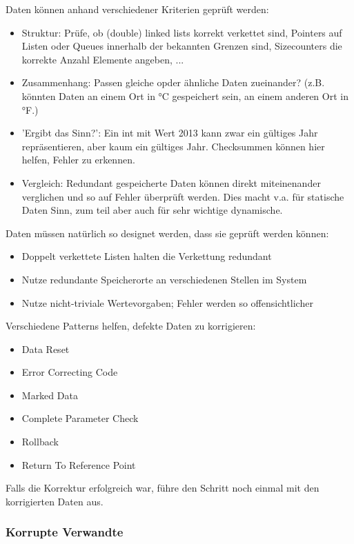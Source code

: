Daten können anhand verschiedener Kriterien geprüft werden:
\begin{itemize}
	\item Struktur: Prüfe, ob (double) linked lists korrekt verkettet sind, Pointers auf Listen oder Queues innerhalb der bekannten Grenzen sind, Sizecounters die korrekte Anzahl Elemente angeben, ...
	\item Zusammenhang: Passen gleiche opder ähnliche Daten zueinander? (z.B. könnten Daten an einem Ort in °C gespeichert sein, an einem anderen Ort in °F.)
	\item 'Ergibt das Sinn?': Ein int mit Wert 2013 kann zwar ein gültiges Jahr repräsentieren, aber kaum ein gültiges Jahr. Checksummen können hier helfen, Fehler zu erkennen.
	\item Vergleich: Redundant gespeicherte Daten können direkt miteinenander verglichen und so auf Fehler überprüft werden. Dies macht v.a. für statische Daten Sinn, zum teil aber auch für sehr wichtige dynamische.
\end{itemize}

Daten müssen natürlich so designet werden, dass sie geprüft werden können:
\begin{itemize}
	\item Doppelt verkettete Listen halten die Verkettung redundant
	\item Nutze redundante Speicherorte an verschiedenen Stellen im System
	\item Nutze nicht-triviale Wertevorgaben; Fehler werden so offensichtlicher
\end{itemize}

Verschiedene Patterns helfen, defekte Daten zu korrigieren:
\begin{itemize}
	\item Data Reset
	\item Error Correcting Code
	\item Marked Data
	\item Complete Parameter Check
	\item Rollback
	\item Return To Reference Point
\end{itemize}

Falls die Korrektur erfolgreich war, führe den Schritt noch einmal mit den korrigierten Daten aus.

\subsubsection*{Korrupte Verwandte}

